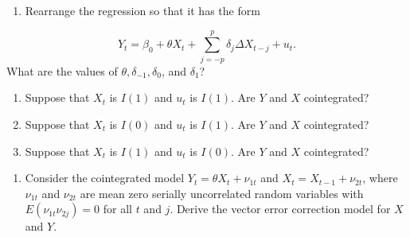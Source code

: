 \documentclass[]{book}
\providecommand{\tightlist}{%
  \setlength{\itemsep}{0pt}\setlength{\parskip}{0pt}}
\begin{document}
\begin{enumerate}
\def\labelenumi{\alph{enumi}.}
\tightlist
\item
  Rearrange the regression so that it has the form
\end{enumerate}

\[Y_t=\beta_0+\theta X_t + \sum_{j=-p}^{p}\delta_j\Delta X_{t-j} + u_t.\] What are the values of \(\theta, \delta_{- 1}, \delta_{0}\), and \(\delta_{1}\)?

\begin{enumerate}
\def\labelenumi{\alph{enumi}.}
\setcounter{enumi}{1}
\tightlist
\item
  Suppose that \(X_t\) is \(I(1)\) and \(u_t\) is \(I(1)\). Are \(Y\) and \(X\) cointegrated?
\item
  Suppose that \(X_t\) is \(I(0)\) and \(u_t\) is \(I(1)\). Are \(Y\) and \(X\) cointegrated?
\item
  Suppose that \(X_t\) is \(I(1)\) and \(u_t\) is \(I(0)\). Are \(Y\) and \(X\) cointegrated?
\end{enumerate}

\begin{enumerate}
\def\labelenumi{\arabic{enumi}.}
\setcounter{enumi}{3}
\tightlist
\item
  Consider the cointegrated model \(Y_t = \theta X_t + \nu_{1t}\) and \(X_t = X_{t - 1} + \nu_{2t}\), where \(\nu_{1t}\) and \(\nu_{2t}\) are mean zero serially uncorrelated random variables with \(E(\nu_{1t}\nu_{2j})=0\) for all \(t\) and \(j\). Derive the vector error correction model for \(X\) and \(Y\).
\end{enumerate}


\end{document}
